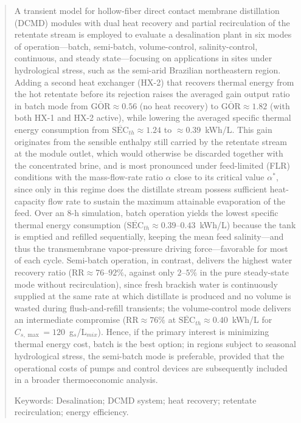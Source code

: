 \documentclass[14pt,letterpaper,fleqn]{extarticle}
\renewcommand{\textbf}[1]{#1}
\begin{document}
\begin{abstract}
A transient model for hollow-fiber direct contact membrane distillation (DCMD)
modules with dual heat recovery and partial recirculation of the retentate stream
is employed to evaluate a desalination plant in six modes of operation---batch,
semi-batch, volume-control, salinity-control, continuous, and steady state---focusing
on applications in sites under hydrological stress, such as the semi-arid Brazilian
northeastern region. Adding a second heat exchanger (HX-2) that recovers thermal
energy from the hot retentate before its rejection raises the averaged gain output
ratio in batch mode from $\overline{\mathrm{GOR}}\approx 0.56$ (no heat recovery)
to $\overline{\mathrm{GOR}}\approx 1.82$ (with both HX-1 and HX-2 active), while
lowering the averaged specific thermal energy consumption from
$\overline{\mathrm{SEC}}_{th}\approx 1.24$ to $\approx 0.39$~kWh/L. This gain
originates from the sensible enthalpy still carried by the retentate stream at
the module outlet, which would otherwise be discarded together with the
concentrated brine, and is most pronounced under feed-limited (FLR) conditions
with the mass-flow-rate ratio $\alpha$ close to its critical value $\alpha^{*}$,
since only in this regime does the distillate stream possess sufficient
heat-capacity flow rate to sustain the maximum attainable evaporation of the feed.
Over an 8-h simulation, batch operation yields the lowest specific thermal energy
consumption ($\overline{\mathrm{SEC}}_{th}\approx 0.39$--$0.43$~kWh/L) because the
tank is emptied and refilled sequentially, keeping the mean feed salinity---and
thus the transmembrane vapor-pressure driving force---favorable for most of each
cycle. Semi-batch operation, in contrast, delivers the highest water recovery
ratio ($\mathrm{RR}\approx 76$--$92\%$, against only $2$--$5\%$ in the pure
steady-state mode without recirculation), since fresh brackish water is
continuously supplied at the same rate at which distillate is produced and no
volume is wasted during flush-and-refill transients; the volume-control mode
delivers an intermediate compromise ($\mathrm{RR}\approx 76\%$ at
$\overline{\mathrm{SEC}}_{th}\approx 0.40$~kWh/L for
$C_{s,\max}=120$~g$_s$/L$_{mix}$). Hence, if the primary interest is minimizing
thermal energy cost, batch is the best option; in regions subject to seasonal
hydrological stress, the semi-batch mode is preferable, provided that the
operational costs of pumps and control devices are subsequently included in a
broader thermoeconomic analysis.

\medskip
\noindent\textbf{Keywords:} Desalination; DCMD system; heat recovery; retentate
recirculation; energy efficiency.
\end{abstract}
\end{document}
